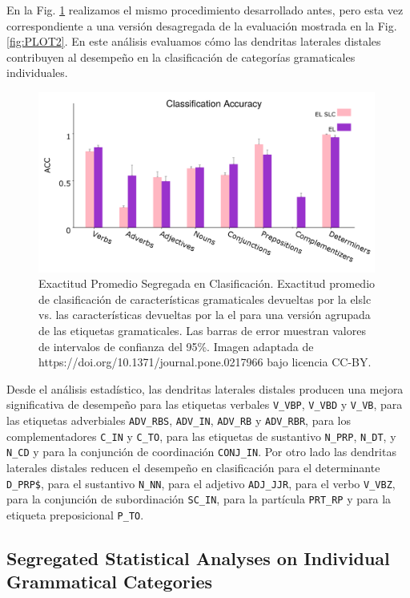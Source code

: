 {En la Fig. \ref{fig:PLOT4} realizamos el mismo procedimiento desarrollado antes, pero esta vez correspondiente a una versión desagregada de la evaluación mostrada en la Fig. \ref{fig:PLOT2}. En este análisis evaluamos cómo las dendritas laterales distales contribuyen al desempeño en la clasificación de categorías gramaticales individuales.

\begin{figure}[ht!]
    \centering
    \includegraphics[width=0.99\textwidth]{PLOT4.png}
    \caption{Exactitud Promedio Segregada en Clasificación. Exactitud promedio de clasificación de características gramaticales devueltas por la \gls{elslc} vs. las características devueltas por la \gls{el} para una versión agrupada de las etiquetas gramaticales. Las barras de error muestran valores de intervalos de confianza del 95\%. Imagen adaptada de https://doi.org/10.1371/journal.pone.0217966 bajo licencia CC-BY.}
    \label{fig:PLOT4}
\end{figure}

Desde el análisis estadístico, las dendritas laterales distales producen una mejora significativa de desempeño para las etiquetas verbales
\texttt{V\_VBP}, \texttt{V\_VBD} y \texttt{V\_VB}, para las etiquetas adverbiales \texttt{ADV\_RBS}, \texttt{ADV\_IN}, \texttt{ADV\_RB} y \texttt{ADV\_RBR}, para los complementadores \texttt{C\_IN} y \texttt{C\_TO}, para las etiquetas de sustantivo \texttt{N\_PRP}, \texttt{N\_DT}, y \texttt{N\_CD} y para la conjunción de coordinación \texttt{CONJ\_IN}.
Por otro lado las dendritas laterales distales reducen el desempeño en clasificación para el determinante
\texttt{D\_PRP\$}, para el sustantivo \texttt{N\_NN}, para el adjetivo \texttt{ADJ\_JJR}, para el verbo \texttt{V\_VBZ}, para la conjunción de subordinación \texttt{SC\_IN}, para la partícula \texttt{PRT\_RP} y para la etiqueta preposicional \texttt{P\_TO}.
}{
\subsection{Segregated Statistical Analyses on Individual Grammatical Categories}
\label{Segregated}

}
